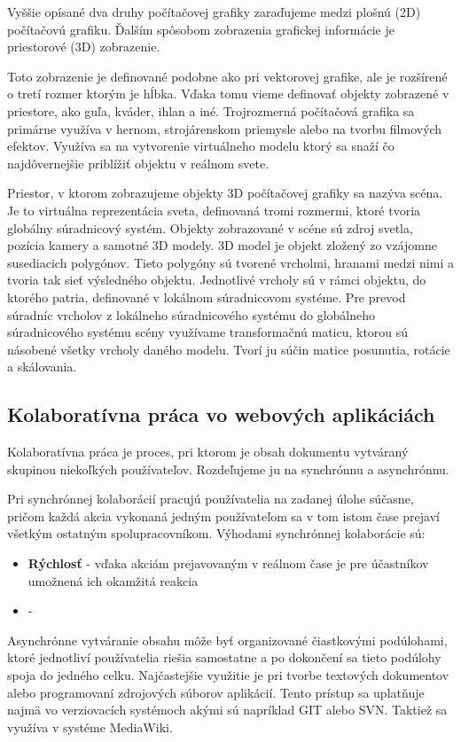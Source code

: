 Vyššie opísané dva druhy počítačovej grafiky zaraďujeme medzi plošnú (2D) počítačovú grafiku. Ďalším spôsobom zobrazenia grafickej informácie je priestorové (3D) zobrazenie. 

Toto zobrazenie je definované podobne ako pri vektorovej grafike, ale je rozšírené o tretí rozmer ktorým je hĺbka. Vďaka tomu vieme definovať objekty zobrazené v priestore, ako guľa, kváder, ihlan a iné. Trojrozmerná počítačová grafika sa primárne využíva v hernom, strojárenskom priemysle alebo na tvorbu filmových efektov. Využíva sa na vytvorenie virtuálneho modelu ktorý sa snaží čo najdôvernejšie priblížiť objektu v reálnom svete. 

Priestor, v ktorom zobrazujeme objekty 3D počítačovej grafiky sa nazýva scéna. Je to virtuálna reprezentácia sveta, definovaná tromi rozmermi, ktoré tvoria globálny súradnicový systém. Objekty zobrazované v scéne sú zdroj svetla, pozícia kamery a samotné 3D modely. 3D model je objekt zložený zo vzájomne susediacich polygónov. Tieto polygóny sú tvorené vrcholmi, hranami medzi nimi a tvoria tak sieť výsledného objektu. Jednotlivé vrcholy sú v rámci objektu, do ktorého patria, definované v lokálnom súradnicovom systéme. Pre prevod súradníc vrcholov z lokálneho súradnicového systému do globálneho súradnicového systému scény využívame transformačnú maticu, ktorou sú násobené všetky vrcholy daného modelu. Tvorí ju súčin matice posunutia, rotácie a skálovania. 

\subsection{Kolaboratívna práca vo webových aplikáciách}

Kolaboratívna práca \cite{doi:10.1177/0021943603259363} je proces, pri ktorom je obsah dokumentu vytváraný skupinou niekoľkých používateľov. Rozdeľujeme ju na synchrónnu a asynchrónnu.

Pri synchrónnej kolaborácií pracujú používatelia na zadanej úlohe súčasne, pričom každá akcia vykonaná jedným používateľom sa v tom istom čase prejaví všetkým ostatným spolupracovníkom. Výhodami synchrónnej kolaborácie sú:
\begin{itemize}
	\item \textbf{Rýchlosť} - vďaka akciám prejavovaným v reálnom čase je pre účastníkov umožnená ich okamžitá reakcia
	\item \textbf{} - 
\end{itemize}

Asynchrónne vytváranie obsahu môže byť organizované čiastkovými podúlohami, ktoré jednotliví používatelia riešia samostatne a po dokončení sa tieto podúlohy spoja do jedného celku. Najčastejšie využitie je pri tvorbe textových dokumentov alebo programovaní zdrojových súborov aplikácií. Tento prístup sa uplatňuje najmä vo verziovacích systémoch akými sú napríklad GIT alebo SVN. Taktiež sa využíva v systéme MediaWiki.

